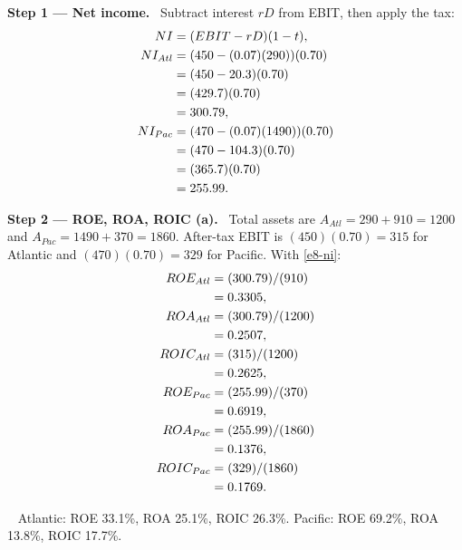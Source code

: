 \documentclass[11pt,a4paper]{article}
\newcommand{\step}[2]{\par\medskip\noindent\textbf{Step #1 --- #2.}~}
\newcommand{\answer}[1]{\par\smallskip\noindent\fbox{\textbf{Answer #1.}}~}
\begin{document}
\step{1}{Net income}
Subtract interest $rD$ from EBIT, then apply the tax:
\begin{align}
  NI &= (EBIT - rD)(1-t), \label{e8-ni}\\
  NI_{Atl} &= (450 - (0.07)(290))(0.70) \notag\\
  &= (450 - 20.3)(0.70) \notag\\
  &= (429.7)(0.70) \notag\\
  &= 300.79, \notag\\
  NI_{Pac} &= (470 - (0.07)(1490))(0.70) \notag\\
  &= (470 - 104.3)(0.70) \notag\\
  &= (365.7)(0.70) \notag\\
  &= 255.99. \notag
\end{align}

\step{2}{ROE, ROA, ROIC (a)}
Total assets are $A_{Atl} = 290 + 910 = 1200$ and $A_{Pac} = 1490 + 370 = 1860$. After-tax EBIT is
$(450)(0.70) = 315$ for Atlantic and $(470)(0.70) = 329$ for Pacific. With \eqref{e8-ni}:
\begin{align}
  ROE_{Atl} &= (300.79)/(910) \notag\\
  &= 0.3305, \notag\\
  ROA_{Atl} &= (300.79)/(1200) \notag\\
  &= 0.2507, \notag\\
  ROIC_{Atl} &= (315)/(1200) \notag\\
  &= 0.2625, \notag\\
  ROE_{Pac} &= (255.99)/(370) \notag\\
  &= 0.6919, \notag\\
  ROA_{Pac} &= (255.99)/(1860) \notag\\
  &= 0.1376, \notag\\
  ROIC_{Pac} &= (329)/(1860) \notag\\
  &= 0.1769. \notag
\end{align}

\answer{(a)} Atlantic: ROE 33.1\%, ROA 25.1\%, ROIC 26.3\%. Pacific: ROE 69.2\%, ROA 13.8\%, ROIC 17.7\%.
\end{document}
